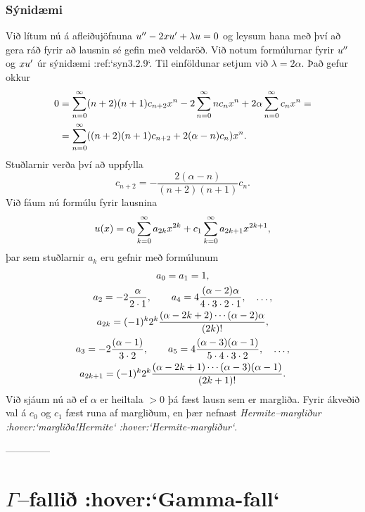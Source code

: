 \subsubsection{Sýnidæmi}  
Við lítum nú á afleiðujöfnuna $u{\sp{\prime\prime}}-2xu{\sp{\prime}}+\lambda u=0$ og
leysum hana  með því að gera ráð fyrir að lausnin sé gefin með
veldaröð. Við notum formúlurnar fyrir $u{\sp{\prime\prime}}$ og $xu{\sp{\prime}}$ úr
sýnidæmi :ref:`syn3.2.9`.  Til einföldunar setjum við $\lambda=2\alpha$. Það
gefur okkur 
\begin{align*}
0&=
\sum\limits_{n=0}\sp\infty (n+2)(n+1)c_{n+2}x\sp n
-2\sum\limits_{n=0}\sp\infty nc_nx\sp n+
2\alpha\sum\limits_{n=0}\sp\infty c_nx\sp n=
\\
&=\sum\limits_{n=0}\sp\infty
((n+2)(n+1)c_{n+2} +2(\alpha-n)c_n)x\sp n.
\end{align*}
Stuðlarnir verða því að uppfylla
$$
c_{n+2}=- \dfrac{2(\alpha-n)}{(n+2)(n+1)}c_n.
$$
Við fáum nú formúlu fyrir lausnina
$$
u(x) = c_0\sum\limits_{k=0}\sp\infty
a_{2k}
x\sp{2k}
+
c_1\sum\limits_{k=0}\sp\infty
a_{2k+1}
x\sp {2k+1},
$$
þar sem stuðlarnir $a_k$ eru gefnir með formúlunum
\begin{gather*}
a_0=a_1=1,\\
a_2=-2\dfrac{\alpha}{2\cdot 1}, \qquad
a_4=4\dfrac{(\alpha-2)\alpha}{4\cdot 3\cdot 2\cdot 1},  \quad\dots,
\\
a_{2k}=(-1)\sp k 2\sp k \dfrac{(\alpha-2k+2)\cdots(\alpha-2)\alpha}{(2k)!},\\
a_3=-2\dfrac{(\alpha-1)}{3\cdot 2}, \qquad
a_5=4\dfrac{(\alpha-3)(\alpha-1)}{5\cdot 4\cdot 3\cdot 2},  \quad\dots,\\
a_{2k+1}= (-1)\sp k 2\sp k
\dfrac{(\alpha-2k+1)\cdots(\alpha-3)(\alpha-1)}{(2k+1)!}.
\end{gather*}
Við sjáum nú að ef $\alpha$ er heiltala $>0$ þá fæst lausn sem er
margliða.   Fyrir ákveðið val á  $c_0$ og $c_1$ fæst runa af margliðum,
en þær nefnast {\it
Hermite--margliður :hover:`margliða!Hermite` :hover:`Hermite-margliður`}.


--------------




\section{$\Gamma$--fallið :hover:`Gamma-fall`}  

